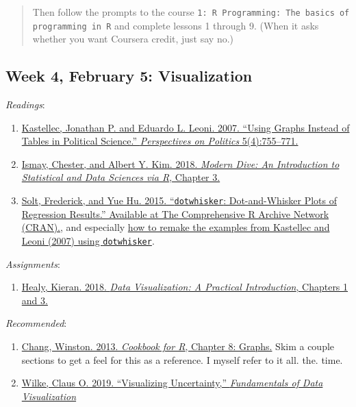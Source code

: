 \documentclass[]{article}
\providecommand{\tightlist}{%
  \setlength{\itemsep}{0pt}\setlength{\parskip}{0pt}}
\begin{document}
\begin{quote}
Then follow the prompts to the course
\texttt{1:~R Programming:~The basics of programming in R} and complete
lessons 1 through 9. (When it asks whether you want Coursera credit,
just say no.)
\end{quote}

\pagebreak

\hypertarget{week-4-february-5-visualization}{%
\subsection{Week 4, February 5:
Visualization}\label{week-4-february-5-visualization}}

\emph{Readings}:

\begin{enumerate}
\def\labelenumi{\arabic{enumi}.}
\tightlist
\item
  \href{http://dx.doi.org.proxy.lib.uiowa.edu/10.1017/S1537592707072209}{Kastellec,
  Jonathan P. and Eduardo L. Leoni. 2007. ``Using Graphs Instead of
  Tables in Political Science.'' \emph{Perspectives on Politics}
  5(4):755--771.}
\item
  \href{https://moderndive.com/3-viz.html}{Ismay, Chester, and Albert Y.
  Kim. 2018. \emph{Modern Dive: An Introduction to Statistical and Data
  Sciences via R}, Chapter 3.}
\item
  \href{https://cran.r-project.org/web/packages/dotwhisker/vignettes/dotwhisker-vignette.html}{Solt,
  Frederick, and Yue Hu. 2015. ``\texttt{dotwhisker}: Dot-and-Whisker
  Plots of Regression Results.'' Available at The Comprehensive R
  Archive Network (CRAN).}, and especially
  \href{https://cran.r-project.org/web/packages/dotwhisker/vignettes/kl2007_examples.html}{how
  to remake the examples from Kastellec and Leoni (2007) using
  \texttt{dotwhisker}}.
\end{enumerate}

\emph{Assignments}:

\begin{enumerate}
\def\labelenumi{\arabic{enumi}.}
\tightlist
\item
  \href{https://socviz.co/lookatdata.html}{Healy, Kieran. 2018.
  \emph{Data Visualization: A Practical Introduction}, Chapters 1 and
  3.}
\end{enumerate}

\emph{Recommended}:

\begin{enumerate}
\def\labelenumi{\arabic{enumi}.}
\tightlist
\item
  \href{http://www.cookbook-r.com/Graphs/}{Chang, Winston. 2013.
  \emph{Cookbook for R}, Chapter 8: Graphs.} Skim a couple sections to
  get a feel for this as a reference. I myself refer to it all. the.
  time.
\item
  \href{https://serialmentor.com/dataviz/visualizing-uncertainty.html}{Wilke,
  Claus O. 2019. ``Visualizing Uncertainty,'' \emph{Fundamentals of Data
  Visualization}}
\end{enumerate}
\end{document}
